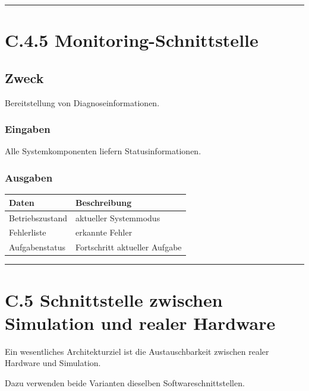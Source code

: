 \documentclass[
  a4paper,
  12pt,
  DIV=12,        %
  parskip=half,  %
  headings=small %
]{scrartcl}
\theoremstyle{definition}
\theoremstyle{definition}
\begin{document}
\begin{center}\rule{0.5\linewidth}{0.5pt}\end{center}

\section{C.4.5
Monitoring-Schnittstelle}\label{c.4.5-monitoring-schnittstelle}

\subsection{Zweck}\label{zweck-9}

Bereitstellung von Diagnoseinformationen.

\subsubsection{Eingaben}\label{eingaben-4}

Alle Systemkomponenten liefern Statusinformationen.

\subsubsection{Ausgaben}\label{ausgaben-4}

\begin{longtable}[]{@{}ll@{}}
\toprule\noalign{}
Daten & Beschreibung \\
\midrule\noalign{}
\endhead
\bottomrule\noalign{}
\endlastfoot
Betriebszustand & aktueller Systemmodus \\
Fehlerliste & erkannte Fehler \\
Aufgabenstatus & Fortschritt aktueller Aufgabe \\
\end{longtable}

\begin{center}\rule{0.5\linewidth}{0.5pt}\end{center}

\section{C.5 Schnittstelle zwischen Simulation und realer
Hardware}\label{c.5-schnittstelle-zwischen-simulation-und-realer-hardware}

Ein wesentliches Architekturziel ist die Austauschbarkeit zwischen
realer Hardware und Simulation.

Dazu verwenden beide Varianten dieselben Softwareschnittstellen.
\end{document}
